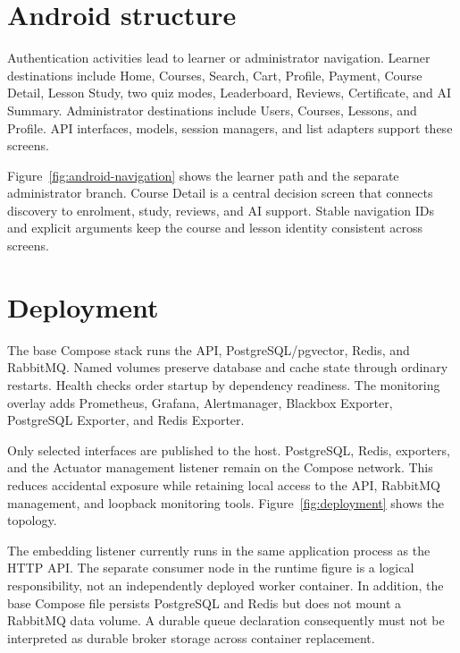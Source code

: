 \documentclass[12pt,a4paper,oneside]{report}
\begin{document}
\section{Android structure}
Authentication activities lead to learner or administrator navigation. Learner
destinations include Home, Courses, Search, Cart, Profile, Payment, Course Detail,
Lesson Study, two quiz modes, Leaderboard, Reviews, Certificate, and AI Summary.
Administrator destinations include Users, Courses, Lessons, and Profile. API
interfaces, models, session managers, and list adapters support these screens.

Figure~\ref{fig:android-navigation} shows the learner path and the separate
administrator branch. Course Detail is a central decision screen that connects
discovery to enrolment, study, reviews, and AI support. Stable navigation IDs and
explicit arguments keep the course and lesson identity consistent across screens.

\androidnavigationdiagram

\section{Deployment}
The base Compose stack runs the API, PostgreSQL/pgvector, Redis, and RabbitMQ.
Named volumes preserve database and cache state through ordinary restarts. Health
checks order startup by dependency readiness. The monitoring overlay adds Prometheus,
Grafana, Alertmanager, Blackbox Exporter, PostgreSQL Exporter, and Redis Exporter.

Only selected interfaces are published to the host. PostgreSQL, Redis, exporters,
and the Actuator management listener remain on the Compose network. This reduces
accidental exposure while retaining local access to the API, RabbitMQ management,
and loopback monitoring tools. Figure~\ref{fig:deployment} shows the topology.

\deploymentdiagram

The embedding listener currently runs in the same application process as the HTTP
API. The separate consumer node in the runtime figure is a logical responsibility,
not an independently deployed worker container. In addition, the base Compose file
persists PostgreSQL and Redis but does not mount a RabbitMQ data volume. A durable
queue declaration consequently must not be interpreted as durable broker storage
across container replacement.
\end{document}
